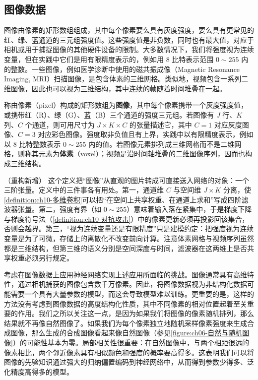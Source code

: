 \documentclass[../../main.tex]{subfiles}
\begin{document}
\subsection{图像数据}\label{subsection:ch10-图像数据}

图像由像素的矩形数组组成，其中每个像素要么具有灰度强度，要么具有更常见的红、绿、蓝通道的三元组强度值。这些强度值是非负数，同时也有最大值，对应于相机或用于捕捉图像的其他硬件设备的限制。大多数情况下，我们将强度视为连续变量，但在实践中它们是用有限精度表示的，例如用 8 比特表示范围 $0\sim 255$ 内的整数。一些图像，例如医学诊断中使用的磁共振成像（Magnetic Resonance Imaging, MRI）扫描图像，是包含体素的三维网格。类似地，视频包含一系列二维图像，因此也可以视为三维结构，其中连续的帧随着时间堆叠在一起。

\begin{definition}[图像数据]\label{definition:ch10-图像数据}
称由像素（pixel）构成的矩形数组为\textbf{图像}，其中每个像素携带一个灰度强度值，或携带红（R）、绿（G）、蓝（B）三个通道的强度三元组。若图像有 $J$ 行、$K$ 列、$C$ 个通道，则可用尺寸为 $J\times K\times C$ 的张量描述它，其中 $C=1$ 对应灰度图像、$C=3$ 对应彩色图像。强度取非负值且有上界，实践中以有限精度表示，例如以 8 比特整数表示 $0\sim 255$ 内的值。若图像元素排列成三维网格而不是二维网格，则称其元素为\textbf{体素}（voxel）；视频是沿时间轴堆叠的二维图像序列，因而也构成三维结构。
\end{definition}

\begin{remark}（重构新增）
这个定义把“图像”从直观的图片转成可直接送入网络的对象：一个三阶张量。定义中的三件事各有用处。第一，通道维 $C$ 与空间维 $J\times K$ 分离，使\cref{definition:ch10-多维卷积}可以把“在空间上共享权重、在通道上求和”写成四阶滤波器张量。第二，强度有界（如 $0\sim 255$）意味着输入落在紧集中，于是梯度下降与梯度符号法（\cref{definition:ch10-对抗攻击}）中的像素更新必须再投影回该集合，否则会越界。第三，“视为连续变量还是有限精度”只是建模约定：把强度视为连续变量是为了可微，存储上的离散化不改变前向计算。注意体素网格与视频序列虽然都是三维结构，但第三维的语义分别是空间深度与时间，滤波器在这两维上是否共享权重必须另行规定。
\end{remark}

考虑在图像数据上应用神经网络实现上述应用所面临的挑战。图像通常具有高维特性，通过相机捕获的图像包含数千万像素。因此，将图像数据视为非结构化数据可能需要一个具有大量参数的模型，而这会导致模型难以训练。更重要的是，这样的方法没有考虑到图像数据的高度结构化性质，其中不同像素的相对位置起着至关重要的作用。我们之所以关注这一点，是因为如果我们将图像的像素随机排列，那么结果就不再像自然图像了。如果我们为每个像素独立地随机采样像素强度来生成合成图像，那么生成的合成图像看起来像自然图像（参见\cref{figure:ch06-自然与随机图像}）的可能性基本为零。局部相关性很重要：在自然图像中，与两个相距很远的像素相比，两个邻近像素具有相似颜色和强度的概率要高得多。这表明我们可以将图像的先验知识通过强大的归纳偏置编码到神经网络中，从而得到参数少得多、泛化精度高得多的模型。
\end{document}
